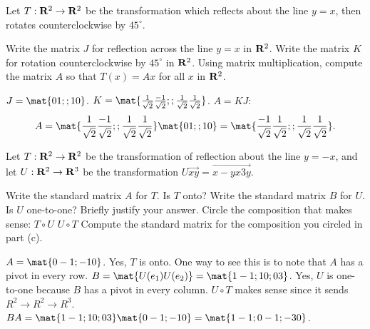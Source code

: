 \begin{problems}
\problem %
Let $T: {\bf R}^2 \to {\bf R}^2$ be the transformation which reflects about the
line $y = x$, then rotates counterclockwise by $45^\circ$.
\begin{subproblems}
  \subproblem Write the matrix $J$ for reflection across the line $y=x$ in
  ${\bf R}^2$.  %
  \subproblem Write the matrix $K$ for rotation counterclockwise
  by $45^\circ$ in ${\bf R}^2$. %
  \subproblem Using matrix multiplication,
  compute the matrix $A$ so that $T(x)=Ax$ for all $x$ in ${\bf R}^2$.
\end{subproblems}

\begin{solution}
\begin{subproblems}
  \subproblem $J=\mat{0 1; ; 1 0}$.
  \subproblem $K=\mat{ \frac{1}{\sqrt{2}} \frac{-1}{\sqrt{2}}; ;
    \frac{1}{\sqrt{2}} \frac{1}{\sqrt{2}}}$.
  \subproblem $A=KJ$:
  \[ A = \mat{ \frac{1}{\sqrt{2}} \frac{-1}{\sqrt{2}}; ; \frac{1}{\sqrt{2}} \frac{1}{\sqrt{2}}}
  \mat{0 1; ; 1 0}
  = \mat{ \frac{-1}{\sqrt{2}} \frac{1}{\sqrt{2}}; ; \frac{1}{\sqrt{2}} \frac{1}{\sqrt{2}}}.\]
\end{subproblems}
\end{solution}


\problem %
Let $T: {\bf R}^2 \to {\bf R}^2$ be the transformation of reflection
about the line $y= -x$, and let $U: {\bf R}^2 \to {\bf R}^3$ be the
transformation $U \vec{x y} = \vec{x-y x 3y}$.
\begin{subproblems}
  \subproblem Write the standard matrix $A$ for $T$.  Is $T$ onto? %
  \subproblem Write the standard matrix $B$ for $U$.  Is $U$
  one-to-one?  Briefly justify your answer. %
  \subproblem Circle the composition that makes sense: \quad
  $T \circ U$ \qquad $U \circ T$ %
  \subproblem Compute the standard matrix for the composition you
  circled in part (c).
\end{subproblems}

\begin{solution}
  \begin{subproblems}
    \subproblem $A=\mat{0 -1; -1 0}$. Yes, $T$ is onto.  One way to
    see this is to note that $A$ has a pivot in every row.
    \subproblem $B=\mat{U(e_1) U(e_2)} = \mat{1 -1; 1 0; 0 3}$.  Yes,
    $U$ is one-to-one because $B$ has a pivot in every column.
    \subproblem $U \circ T$ makes sense since it sends
    $R^2 \to R^2 \to R^3$.  \subproblem
    $BA = \mat{1 -1; 1 0; 0 3} \mat{0 -1; -1 0} =
    \mat{1 -1; 0 -1; -3 0}$.
  \end{subproblems}
\end{solution}


\end{problems}
